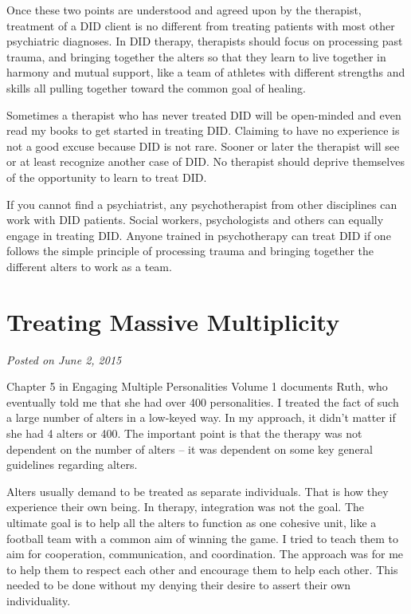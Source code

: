 \documentclass[]{book}
\begin{document}
Once these two points are understood and agreed upon by the therapist, treatment of a DID client is no different from treating patients with most other psychiatric diagnoses. In DID therapy, therapists should focus on processing past trauma, and bringing together the alters so that they learn to live together in harmony and mutual support, like a team of athletes with different strengths and skills all pulling together toward the common goal of healing.

Sometimes a therapist who has never treated DID will be open-minded and even read my books to get started in treating DID. Claiming to have no experience is not a good excuse because DID is not rare. Sooner or later the therapist will see or at least recognize another case of DID. No therapist should deprive themselves of the opportunity to learn to treat DID.

If you cannot find a psychiatrist, any psychotherapist from other disciplines can work with DID patients. Social workers, psychologists and others can equally engage in treating DID. Anyone trained in psychotherapy can treat DID if one follows the simple principle of processing trauma and bringing together the different alters to work as a team.

\hypertarget{treating-massive-multiplicity}{%
\section{Treating Massive Multiplicity}\label{treating-massive-multiplicity}}

\emph{Posted on June 2, 2015}

Chapter 5 in Engaging Multiple Personalities Volume 1 documents Ruth, who eventually told me that she had over 400 personalities. I treated the fact of such a large number of alters in a low-keyed way. In my approach, it didn't matter if she had 4 alters or 400. The important point is that the therapy was not dependent on the number of alters -- it was dependent on some key general guidelines regarding alters.

Alters usually demand to be treated as separate individuals. That is how they experience their own being. In therapy, integration was not the goal. The ultimate goal is to help all the alters to function as one cohesive unit, like a football team with a common aim of winning the game. I tried to teach them to aim for cooperation, communication, and coordination. The approach was for me to help them to respect each other and encourage them to help each other. This needed to be done without my denying their desire to assert their own individuality.
\end{document}
